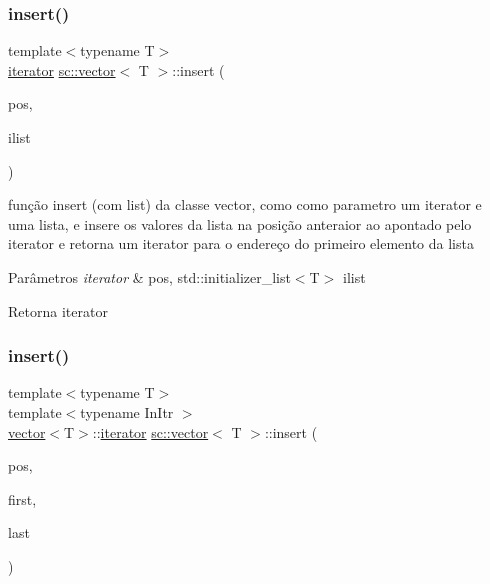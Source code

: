 \subsubsection{\texorpdfstring{insert()}{insert()}\hspace{0.1cm}{\footnotesize\ttfamily [5/9]}}
{\footnotesize\ttfamily template$<$typename T$>$ \\
\mbox{\hyperlink{classsc_1_1vector_1_1iterator}{iterator}} \mbox{\hyperlink{classsc_1_1vector}{sc\+::vector}}$<$ T $>$\+::insert (\begin{DoxyParamCaption}\item[{\mbox{\hyperlink{classsc_1_1vector_1_1iterator}{iterator}}}]{pos,  }\item[{std\+::initializer\+\_\+list$<$ T $>$}]{ilist }\end{DoxyParamCaption})}

função insert (com list) da classe vector, como como parametro um iterator e uma lista, e insere os valores da lista na posição anteraior ao apontado pelo iterator e retorna um iterator para o endereço do primeiro elemento da lista 
\begin{DoxyParams}{Parâmetros}
{\em iterator} & pos, std\+::initializer\+\_\+list$<$\+T$>$ ilist \\
\hline
\end{DoxyParams}
\begin{DoxyReturn}{Retorna}
iterator 
\end{DoxyReturn}
\mbox{\label{classsc_1_1vector_a774a81ea7131584862592c29a8137e28}} 
\subsubsection{\texorpdfstring{insert()}{insert()}\hspace{0.1cm}{\footnotesize\ttfamily [6/9]}}
{\footnotesize\ttfamily template$<$typename T$>$ \\
template$<$typename In\+Itr $>$ \\
\mbox{\hyperlink{classsc_1_1vector}{vector}}$<$T$>$\+::\mbox{\hyperlink{classsc_1_1vector_1_1iterator}{iterator}} \mbox{\hyperlink{classsc_1_1vector}{sc\+::vector}}$<$ T $>$\+::insert (\begin{DoxyParamCaption}\item[{typename \mbox{\hyperlink{classsc_1_1vector}{vector}}$<$ T $>$\+::\mbox{\hyperlink{classsc_1_1vector_1_1iterator}{iterator}}}]{pos,  }\item[{In\+Itr}]{first,  }\item[{In\+Itr}]{last }\end{DoxyParamCaption})}

